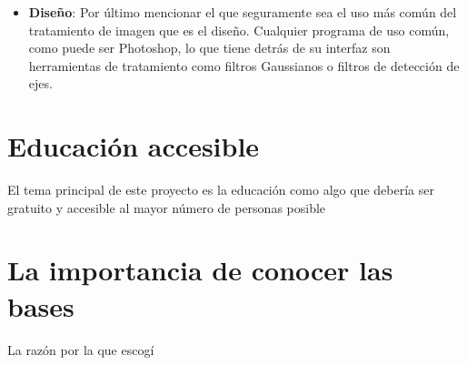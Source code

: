 \begin{itemize}
\item \textbf{Diseño}: Por último mencionar el que seguramente sea el uso más común del tratamiento de imagen que es el diseño. Cualquier programa de uso común, como puede ser Photoshop, lo que tiene detrás de su interfaz son herramientas de tratamiento como filtros Gaussianos o filtros de detección de ejes.\\

\end{itemize}

\section{Educación accesible}

El tema principal de este proyecto es la educación como algo que debería ser gratuito y accesible al mayor número de personas posible

\section{La importancia de conocer las bases}

La razón por la que escogí 

